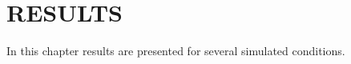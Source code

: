 %
%
%
%
%
%
%

\chapter{RESULTS} \label{chap:results}
In this chapter results are presented for several simulated conditions.

